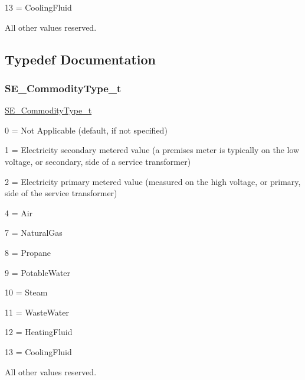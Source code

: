 13 = Cooling\+Fluid

All other values reserved. 

\subsection{Typedef Documentation}
\mbox{\label{group__CommodityType_ga8c7268080f04fe151221243d3c68eb8c}} 
\subsubsection{\texorpdfstring{S\+E\+\_\+\+Commodity\+Type\+\_\+t}{SE\_CommodityType\_t}}
{\footnotesize\ttfamily \hyperlink{group__CommodityType_ga8c7268080f04fe151221243d3c68eb8c}{S\+E\+\_\+\+Commodity\+Type\+\_\+t}}

0 = Not Applicable (default, if not specified)

1 = Electricity secondary metered value (a premises meter is typically on the low voltage, or secondary, side of a service transformer)

2 = Electricity primary metered value (measured on the high voltage, or primary, side of the service transformer)

4 = Air

7 = Natural\+Gas

8 = Propane

9 = Potable\+Water

10 = Steam

11 = Waste\+Water

12 = Heating\+Fluid

13 = Cooling\+Fluid

All other values reserved. 